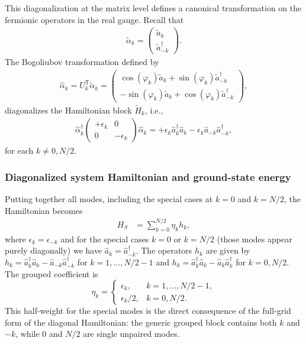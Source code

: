 This diagonalization at the matrix level defines a canonical transformation on
the fermionic operators in the real gauge. Recall that
\begin{align}
    \tilde{\alpha}_k = \begin{pmatrix}
                           \tilde{a}_k\\
                           \tilde{a}_{-k}^\dagger
                       \end{pmatrix}.
\end{align}
The Bogoliubov transformation defined by
\begin{align}
    \hat{\alpha}_k = U_k^\mathsf{T} \tilde{\alpha}_k =
    \begin{pmatrix}
        \cos(\varphi_k) \tilde{a}_k
        +
        \sin(\varphi_k) \tilde{a}_{-k}^\dagger
        \\
        -\sin(\varphi_k) \tilde{a}_k
        +
        \cos(\varphi_k) \tilde{a}_{-k}^\dagger
    \end{pmatrix},
\end{align}
diagonalizes the Hamiltonian block $\tilde{H}_k$, i.e.,
\begin{align}
    \hat{\alpha}_k^\dagger
    \begin{pmatrix}
        + \epsilon_k &0\\
        0            &- \epsilon_k
    \end{pmatrix}
    \hat{\alpha}_k
    = + \epsilon_k \hat{a}_k^\dagger \hat{a}_k
    -
    \epsilon_k \hat{a}_{-k} \hat{a}_{-k}^\dagger,
\end{align}
for each $k\neq 0,N/2$.


\subsubsection{Diagonalized system Hamiltonian and ground-state energy}

Putting together all modes, including the special cases at $k=0$ and $k=N/2$, the Hamiltonian becomes
\begin{align}
    H_S
     &= \sum_{k=0}^{N/2} \eta_k h_k,
    \label{eq:bogoliubov_HS_diag}
\end{align}
where $\epsilon_k=\epsilon_{-k}$ and for the special cases $k=0$ or $k=N/2$ (those modes appear purely diagonally) we have $\hat{a}_k=\hat{a}_{-k}^\dagger$. The operators $h_k$ are given by  $h_k=\hat{a}^\dagger_k \hat{a}_k-\hat{a}_{-k}\hat{a}_{-k}^\dagger$ for $k=1,\ldots,N/2-1$ and $h_k=\hat{a}_k^\dagger \hat{a}_k-\hat{a}_k \hat{a}_k^\dagger$ for $k=0,N/2$.  The grouped coefficient is
\begin{equation}
    \eta_k =
    \begin{cases}
        \epsilon_k, & k=1,\ldots,N/2-1,\\[2mm]
        \epsilon_k/2, & k=0,N/2.
    \end{cases}
    \label{eq:app:grouped_mode_weight}
\end{equation}
This half-weight for the special modes is the direct consequence of the
full-grid form of the diagonal Hamiltonian: the generic grouped block contains
both $k$ and $-k$, while $0$ and $N/2$ are single unpaired modes.

